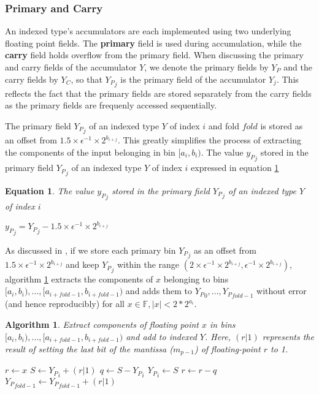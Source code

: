 \documentclass[12pt]{article}
\providecommand{\F}{\ensuremath{\mathbb{F}}}
\theoremstyle{plain}
\newtheorem{alg}{Algorithm}[section]
\newtheorem{eq}{Equation}[section]
\begin{document}
    \subsubsection{Primary and Carry}
      An indexed type's accumulators are each implemented using two underlying floating point fields. The \textbf{primary} field is used during accumulation, while the \textbf{carry} field holds overflow from the primary field. When discussing the primary and carry fields of the accumulator $Y$, we denote the primary fields by $Y_P$ and the carry fields by $Y_C$, so that ${Y_P}_j$ is the primary field of the accumulator $Y_j$. This reflects the fact that the primary fields are stored separately from the carry fields as the primary fields are frequenly accessed sequentially.

      The primary field ${Y_P}_j$ of an indexed type $Y$ of index $i$ and fold $fold$ is stored as an offset from $1.5\times \epsilon^{-1} \times 2^{b_{i + j}}$. This greatly simplifies the process of extracting the components of the input belonging in bin $[a_i, b_i)$.
      The value ${y_P}_j$ stored in the primary field ${Y_P}_j$ of an indexed type $Y$ of index $i$ expressed in equation \ref{eq:pri}
      \begin{eq} The value ${y_P}_j$ stored in the primary field ${Y_P}_j$ of an indexed type $Y$ of index $i$

        ${y_P}_j = {Y_P}_j - 1.5\times\epsilon^{-1}\times2^{b_{i + j}}$
        \label{eq:pri}
      \end{eq}
      As discussed in \cite{repsum}, if we store each primary bin ${Y_P}_j$ as an offset from $1.5 \times \epsilon^{-1} \times 2^{b_{i + j}}$ and keep ${Y_P}_j$ within the range $(2 \times \epsilon^{-1} \times 2^{b_{i + j}}, \epsilon^{-1} \times 2^{b_{i + j}})$, algorithm \ref{alg:deposit} extracts the components of $x$ belonging to bins $[a_i, b_i), ..., [a_{i + fold - 1}, b_{i + fold - 1})$ and adds them to ${Y_P}_0, ..., {Y_P}_{fold - 1}$ without error (and hence reproducibly) for all $x \in \F, |x| < 2 * 2^{a_i}$.
      \begin{alg}
        Extract components of floating point $x$ in bins $[a_i, b_i), ..., [a_{i + fold - 1}, b_{i + fold - 1})$ and add to indexed $Y$. Here, $(r | 1)$ represents the result of setting the last bit of the mantissa ($m_{p - 1}$) of floating-point $r$ to 1.
        \begin{algorithmic}
            \State $r \gets x$
              \State $S \gets {Y_P}_i + (r | 1)$
              \State $q \gets S - {Y_P}_i$
              \State ${Y_P}_i \gets S$
              \State $r \gets r - q$
            \EndFor
            \State ${Y_P}_{fold - 1} \gets {Y_P}_{fold - 1} + (r | 1)$
          \EndFunction
        \end{algorithmic}
        \label{alg:deposit}
      \end{alg}
\end{document}
